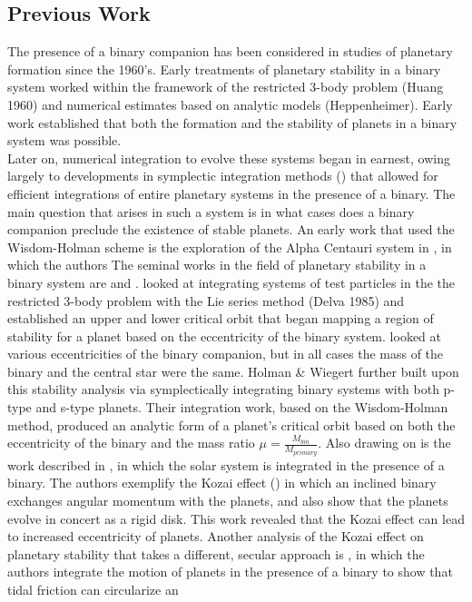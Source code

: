 \documentclass[manuscript]{aastex631}
\begin{document}
\subsection{Previous Work}
The presence of a binary companion has been considered in studies of planetary formation since the 1960's. Early treatments of planetary stability in a binary system worked
within the framework of the restricted 3-body problem (Huang 1960) and numerical estimates based on analytic models (Heppenheimer). Early work established that 
both the formation and the stability of planets in a binary system was possible.\\
Later on, numerical integration to evolve these systems began in earnest, owing largely to developments in symplectic integration methods (\cite{wis91}) that 
allowed for efficient integrations of entire planetary systems in the presence of a binary. The main question that arises in such a system is in what cases does a binary 
companion preclude the existence of stable planets. An early work that used the Wisdom-Holman scheme is the exploration of the Alpha Centauri system in \cite{wie97},
in which the authors 
The seminal works in the field of planetary stability in a binary system are \cite{dvo86} and \cite{hol99}. \cite{dvo86} looked at integrating systems of test
particles in the
the restricted 3-body problem with the Lie series method (Delva 1985) and established an upper and lower critical orbit that began mapping a region of stability 
for a planet based on the eccentricity of the binary system. \cite{dvo86} looked at various eccentricities of the binary companion, but in all cases the mass of the binary and 
the central star were the same. 
 Holman \& Wiegert further built upon this stability analysis via symplectically integrating binary systems 
with both p-type and s-type planets. Their integration work, based on the Wisdom-Holman method,
 produced an analytic form of a planet's critical orbit based on both the eccentricity of the binary and the mass
ratio $\mu = \frac{M_{bin}}{M_{primary}}$. Also drawing on \cite{wis91} is the work described in \cite{ina97}, in which the solar system is integrated in the presence of a 
binary. The authors exemplify the Kozai effect (\cite{koz62}) in which an inclined binary exchanges angular momentum with the planets, and also show that the planets evolve in concert 
as a rigid disk. This work revealed that the Kozai effect can lead to increased eccentricity of planets. Another analysis of the Kozai effect on planetary stability that 
takes a different, secular approach is \cite{fab07}, in which the authors integrate the motion of planets in the presence of a binary to show that tidal friction can circularize an 
\end{document}

